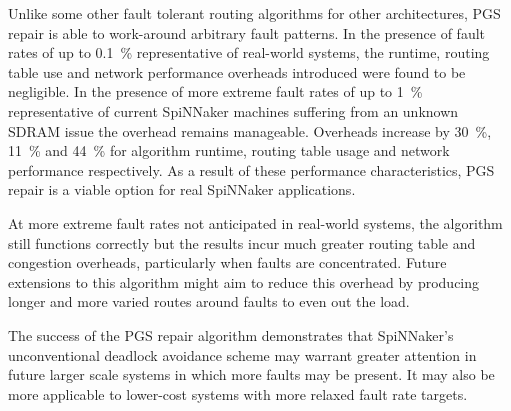 		Unlike some other fault tolerant routing algorithms for other
		architectures, PGS repair is able to work-around arbitrary fault patterns.
		In the presence of fault rates of up to \SI{0.1}{\percent} representative
		of real-world systems, the runtime, routing table use and network
		performance overheads introduced were found to be negligible.  In the
		presence of more extreme fault rates of up to \SI{1}{\percent}
		representative of current SpiNNaker machines suffering from an unknown
		SDRAM issue the overhead remains manageable. Overheads increase by
		\SI{30}{\percent}, \SI{11}{\percent} and \SI{44}{\percent} for algorithm
		runtime, routing table usage and network performance respectively.  As a
		result of these performance characteristics, PGS repair is a viable option
		for real SpiNNaker applications.
		
		At more extreme fault rates not anticipated in real-world systems, the
		algorithm still functions correctly but the results incur much greater
		routing table and congestion overheads, particularly when faults are
		concentrated. Future extensions to this algorithm might aim to reduce this
		overhead by producing longer and more varied routes around faults to even
		out the load.
		
		The success of the PGS repair algorithm demonstrates that SpiNNaker's
		unconventional deadlock avoidance scheme may warrant greater attention in
		future larger scale systems in which more faults may be present. It may
		also be more applicable to lower-cost systems with more relaxed fault rate
		targets.
